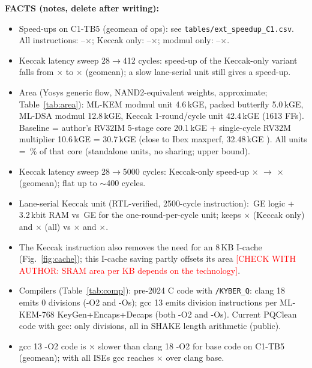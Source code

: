 \documentclass[preprint,12pt,authoryear]{elsarticle}
\newcommand{\CK}[1]{\textcolor{red}{[CHECK WITH AUTHOR: #1]}}
\newenvironment{facts}{\par\small\noindent\textbf{FACTS (notes, delete after writing):}\begin{itemize}\setlength\itemsep{0pt}}{\end{itemize}\normalsize}
\begin{document}
\begin{facts}
\item Speed-ups on C1-TB5 (geomean of ops): see \texttt{tables/ext\_speedup\_C1.csv}. All instructions: \FactAllSpeedMin--\FactAllSpeedMax$\times$; Keccak only: \FactKSpeedMin--\FactKSpeedMax$\times$; modmul only: \FactMSpeedMin--\FactMSpeedMax$\times$.
\item Keccak latency sweep 28$\rightarrow$412 cycles: speed-up of the Keccak-only variant falls from \FactKLatFast$\times$ to \FactKLatSlow$\times$ (geomean); a slow lane-serial unit still gives a speed-up.
\item Area (Yosys generic flow, NAND2-equivalent weights, approximate; Table~\ref{tab:area}): ML-KEM modmul unit 4.6\,kGE, packed butterfly 5.0\,kGE, ML-DSA modmul 12.8\,kGE, Keccak 1-round/cycle unit 42.4\,kGE (1613 FFs). Baseline = author's RV32IM 5-stage core 20.1\,kGE + single-cycle RV32M multiplier 10.6\,kGE = 30.7\,kGE (close to Ibex maxperf, 32.48\,kGE \citep{ibex}). All units = \FactAllAreaPct\,\% of that core (standalone units, no sharing; upper bound).
\item Keccak latency sweep 28$\rightarrow$5000 cycles: Keccak-only speed-up \FactKLatFast$\times$ $\rightarrow$ \FactKLatSlow$\times$ (geomean); flat up to $\sim$400 cycles.
\item Lane-serial Keccak unit (RTL-verified, 2500-cycle instruction): \FactLsGE\,GE logic + 3.2\,kbit RAM vs \FactKfGE\,GE for the one-round-per-cycle unit; keeps \FactKLsSpeed$\times$ (Keccak only) and \FactAllLsSpeed$\times$ (all) vs \FactKSpeedGm$\times$ and \FactAllSpeedGm$\times$.
\item The Keccak instruction also removes the need for an 8\,KB I-cache (Fig.~\ref{fig:cache}); this I-cache saving partly offsets its area \CK{SRAM area per KB depends on the technology}.
\item Compilers (Table~\ref{tab:comp}): pre-2024 C code with \texttt{/KYBER\_Q}: clang 18 emits 0 divisions (-O2 and -Os); gcc 13 emits \FactGccDivPrefix{} division instructions per ML-KEM-768 KeyGen+Encaps+Decaps (both -O2 and -Os). Current PQClean code with gcc: only \FactGccDivBase{} divisions, all in SHAKE length arithmetic (public).
\item gcc 13 -O2 code is \FactGccSlow$\times$ slower than clang 18 -O2 for base code on C1-TB5 (geomean); with all ISEs gcc reaches \FactGccAllSpeed$\times$ over clang base.
\end{facts}
\end{document}
